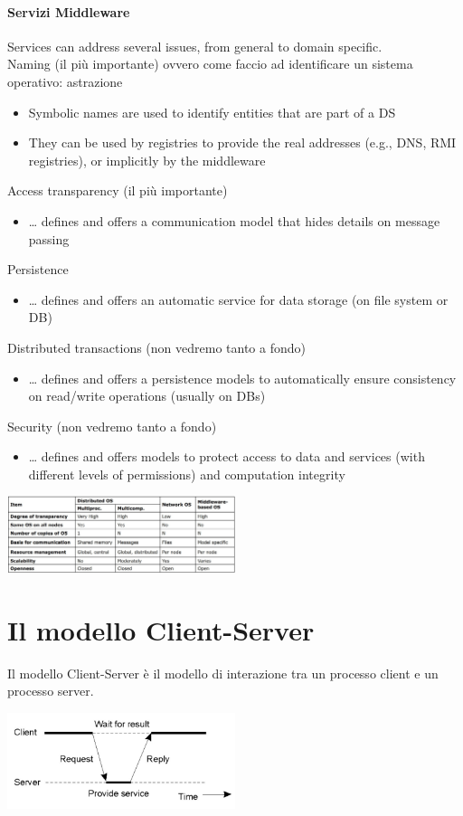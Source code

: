 \subsubsection{Servizi Middleware}
Services can address several issues, from general to domain specific.
\\Naming (il più importante) ovvero come faccio ad identificare un sistema operativo: astrazione
\begin{itemize}
    \item Symbolic names are used to identify entities that are part of a DS
    \item They can be used by registries to provide the real addresses (e.g., DNS, RMI registries), or implicitly by the middleware
\end{itemize}
Access transparency (il più importante)
\begin{itemize}
    \item … defines and offers a communication model that hides details on message passing
\end{itemize}
Persistence
\begin{itemize}
    \item … defines and offers an automatic service for data storage (on file system or DB)
\end{itemize}
Distributed transactions (non vedremo tanto a fondo)
\begin{itemize}
    \item … defines and offers a persistence models to automatically ensure consistency on read/write operations (usually on DBs)
\end{itemize}
Security (non vedremo tanto a fondo)
\begin{itemize}
    \item … defines and offers models to protect access to data and services (with different levels of permissions) and computation integrity
\end{itemize}
\begin{center}
    \includegraphics[width=0.5\textwidth]{img/confrontoFraSistemi1.jpg}
\end{center}


\chapter{Il modello Client-Server}
Il modello Client-Server è il modello di interazione tra un processo client e un processo server.
\begin{center}
    \includegraphics[width=0.5\textwidth]{img/modelloCS1.jpg}
\end{center}